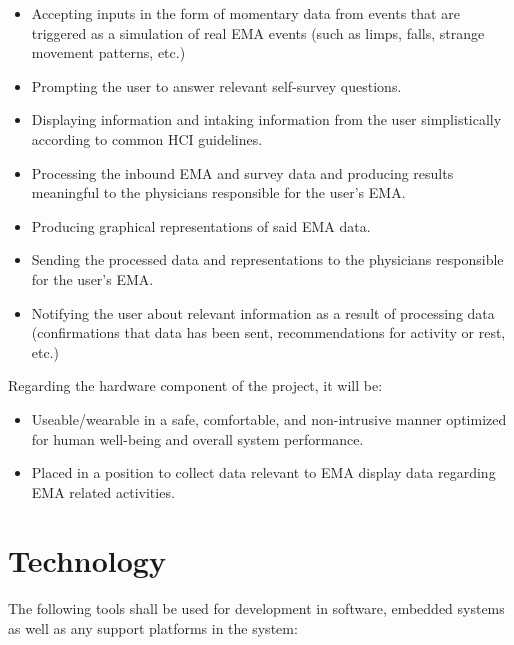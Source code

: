 \documentclass[12pt]{article}
\begin{document}
\begin{itemize}
\item Accepting inputs in the form of momentary data from events that are triggered as a simulation of real EMA events (such as limps, falls, strange movement patterns, etc.)
\item Prompting the user to answer relevant self-survey questions.
\item Displaying information and intaking information from the user simplistically according to common HCI guidelines.
\item Processing the inbound EMA and survey data and producing results meaningful to the physicians responsible for the user's EMA.
\item Producing graphical representations of said EMA data.
\item Sending the processed data and representations to the physicians responsible for the user's EMA.
\item Notifying the user about relevant information as a result of processing data (confirmations that data has been sent, recommendations for activity or rest, etc.)
\end{itemize}

Regarding the hardware component of the project, it will be:\\

\begin{itemize}
\item Useable/wearable in a safe, comfortable, and non-intrusive manner optimized for human well-being and overall system performance.
\item Placed in a position to collect data relevant to EMA display data regarding EMA related activities.
\end{itemize}

\section{Technology}
The following tools shall be used for development in software, embedded systems as well as any support platforms in the system:
\end{document}
